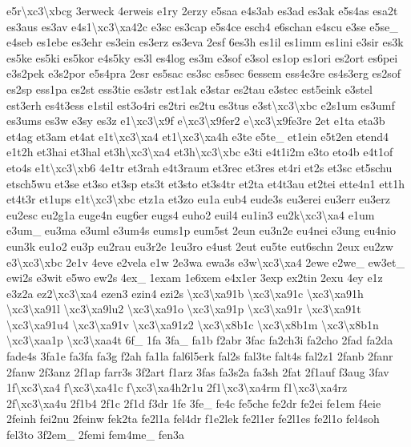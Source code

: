 {e5r\textbackslash{}xc3\textbackslash{}xbcg 3erweck 4erweis e1ry 2erzy e5saa e4s3ab es3ad es3ak e5s4as esa2t es3aus es3av e4s1\textbackslash{}xc3\textbackslash{}xa42c e3sc es3cap e5s4ce esch4 e6schan e4scu e3se e5se\-\_\- e4seb es1ebe es3ehr es3ein es3erz es3eva 2esf 6es3h es1il es1imm es1ini e3sir es3k es5ke es5ki es5kor e4s5ky es3l es4log es3m e3sof e3sol es1op es1ori es2ort es6pei e3s2pek e3s2por e5s4pra 2esr es5sac es3sc es5sec 6essem ess4e3re es4s3erg es2sof es2sp ess1pa es2st ess3tie es3str est1ak e3star es2tau e3stec est5eink e3stel est3erh es4t3ess e1stil est3o4ri es2tri es2tu es3tus e3st\textbackslash{}xc3\textbackslash{}xbc e2s1um es3umf es3ums es3w e3sy es3z e1\textbackslash{}xc3\textbackslash{}x9f e\textbackslash{}xc3\textbackslash{}x9fer2 e\textbackslash{}xc3\textbackslash{}x9fe3re 2et e1ta eta3b et4ag et3am et4at e1t\textbackslash{}xc3\textbackslash{}xa4 et1\textbackslash{}xc3\textbackslash{}xa4h e3te e5te\-\_\- et1ein e5t2en etend4 e1t2h et3hai et3hal et3h\textbackslash{}xc3\textbackslash{}xa4 et3h\textbackslash{}xc3\textbackslash{}xbc e3ti e4t1i2m e3to eto4b e4t1of eto4s e1t\textbackslash{}xc3\textbackslash{}xb6 4e1tr et3rah e4t3raum et3rec et3res et4ri et2s et3sc et5schu etsch5wu et3se et3so et3sp ets3t et3sto et3s4tr et2ta et4t3au et2tei ette4n1 ett1h et4t3r et1ups e1t\textbackslash{}xc3\textbackslash{}xbc etz1a et3zo eu1a eub4 eude3s eu3erei eu3err eu3erz eu2esc eu2g1a euge4n eug6er eugs4 euho2 euil4 eu1in3 eu2k\textbackslash{}xc3\textbackslash{}xa4 e1um e3um\-\_\- eu3ma e3uml e3um4s eums1p eum5st 2eun eu3n2e eu4nei e3ung eu4nio eun3k eu1o2 eu3p eu2rau eu3r2e 1eu3ro e4ust 2eut eu5te eut6schn 2eux eu2zw e3\textbackslash{}xc3\textbackslash{}xbc 2e1v 4eve e2vela e1w 2e3wa ewa3s e3w\textbackslash{}xc3\textbackslash{}xa4 2ewe e2we\-\_\- ew3et\-\_\- ewi2s e3wit e5wo ew2s 4ex\-\_\- 1exam 1e6xem e4x1er 3exp ex2tin 2exu 4ey e1z e3z2a ez2\textbackslash{}xc3\textbackslash{}xa4 ezen3 ezin4 ezi2s \textbackslash{}xc3\textbackslash{}xa91b \textbackslash{}xc3\textbackslash{}xa91c \textbackslash{}xc3\textbackslash{}xa91h \textbackslash{}xc3\textbackslash{}xa91l \textbackslash{}xc3\textbackslash{}xa9lu2 \textbackslash{}xc3\textbackslash{}xa91o \textbackslash{}xc3\textbackslash{}xa91p \textbackslash{}xc3\textbackslash{}xa91r \textbackslash{}xc3\textbackslash{}xa91t \textbackslash{}xc3\textbackslash{}xa91u4 \textbackslash{}xc3\textbackslash{}xa91v \textbackslash{}xc3\textbackslash{}xa91z2 \textbackslash{}xc3\textbackslash{}x8b1c \textbackslash{}xc3\textbackslash{}x8b1m \textbackslash{}xc3\textbackslash{}x8b1n \textbackslash{}xc3\textbackslash{}xaa1p \textbackslash{}xc3\textbackslash{}xaa4t 6f\-\_\- 1fa 3fa\-\_\- fa1b f2abr 3fac fa2ch3i fa2cho 2fad fa2da fade4s 3fa1e fa3fa fa3g f2ah fa1la fal6l5erk fal2s fal3te falt4s fal2z1 2fanb 2fanr 2fanw 2f3anz 2f1ap farr3s 3f2art f1arz 3fas fa3s2a fa3sh 2fat 2f1auf f3aug 3fav 1f\textbackslash{}xc3\textbackslash{}xa4 f\textbackslash{}xc3\textbackslash{}xa41c f\textbackslash{}xc3\textbackslash{}xa4h2r1u 2f1\textbackslash{}xc3\textbackslash{}xa4rm f1\textbackslash{}xc3\textbackslash{}xa4rz 2f\textbackslash{}xc3\textbackslash{}xa4u 2f1b4 2f1c 2f1d f3dr 1fe 3fe\-\_\- fe4c fe5che fe2dr fe2ei fe1em f4eie 2feinh fei2nu 2feinw fek2ta fe2l1a fel4dr f1e2lek fe2l1er fe2l1es fe2l1o fel4soh fel3to 3f2em\-\_\- 2femi fem4me\-\_\- fen3a }
